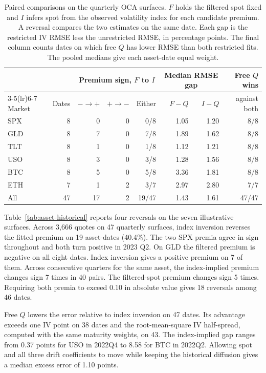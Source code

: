 \documentclass[11pt,a4paper]{article}
\theoremstyle{definition}
\theoremstyle{remark}
\begin{document}
\begin{table}[htbp]\centering\small
\setlength{\tabcolsep}{4pt}
\begin{tabular}{@{}lrrrrrrr@{}}\toprule
 & & \multicolumn{3}{c}{Premium sign, $F$ to $I$} &
 \multicolumn{2}{c}{Median RMSE gap} & Free $Q$ wins\\
\cmidrule(lr){3-5}\cmidrule(lr){6-7}
Market & Dates & $-\to+$ & $+\to-$ & Either & $F-Q$ & $I-Q$ & against both\\\midrule
SPX & 8 & 0 & 0 & 0/8 & 1.05 & 1.20 & 8/8 \\
GLD & 8 & 7 & 0 & 7/8 & 1.89 & 1.62 & 8/8 \\
TLT & 8 & 1 & 0 & 1/8 & 1.12 & 1.21 & 8/8 \\
USO & 8 & 3 & 0 & 3/8 & 1.28 & 1.56 & 8/8 \\
BTC & 8 & 5 & 0 & 5/8 & 3.36 & 1.81 & 8/8 \\
ETH & 7 & 1 & 2 & 3/7 & 2.97 & 2.80 & 7/7 \\
\midrule
All & 47 & 17 & 2 & 19/47 & 1.43 & 1.61 & 47/47 \\
\bottomrule\end{tabular}
\caption{Paired comparisons on the quarterly OCA surfaces. $F$ holds the filtered
spot fixed and $I$ infers spot from the observed volatility index for each candidate
premium. A reversal compares the two estimates on the same date. Each gap is the
restricted IV RMSE less the unrestricted RMSE, in percentage points. The final
column counts dates on which free $Q$ has lower RMSE than both restricted fits.
The pooled medians give each asset-date equal weight.}
\label{tab:quarterly-premia}\end{table}

Table~\ref{tab:asset-historical} reports four reversals on the seven illustrative
surfaces. Across 3,666 quotes on 47 quarterly
surfaces, index inversion reverses the fitted premium on 19
asset-dates (40.4\%).
The two SPX premia agree in sign throughout and both turn positive in
2023 Q2. On GLD the filtered premium is negative on all
eight dates. Index inversion gives a positive premium on 7 of them.
Across consecutive quarters for the same asset, the index-implied premium
changes sign 7 times in 40
pairs. The filtered-spot premium changes sign 5 times.
Requiring both premia to exceed 0.10 in absolute value gives
18 reversals among 46 dates.

Free $Q$ lowers the error relative to index inversion on 47
dates. Its advantage exceeds one IV point on 38 dates
and the root-mean-square IV half-spread, computed with the same maturity
weights, on 43.
The index-implied gap ranges from 0.37 points for
USO in 2022Q4 to 8.58 for
BTC in 2022Q2.
Allowing spot and all three drift coefficients to move while keeping the historical
diffusion gives a median excess error of 1.10 points.
\end{document}
